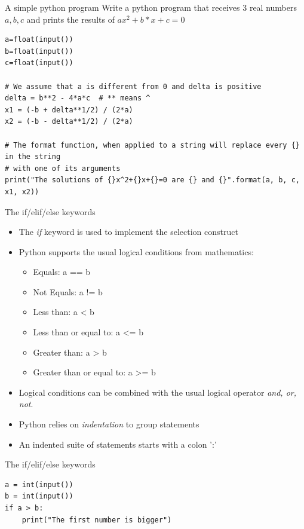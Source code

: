 \documentclass[aspectratio=169,]{beamer}
\begin{document}
\begin{frame}[fragile]{A simple python program}
    Write a python program that receives 3 real numbers $a, b, c$ and prints the results of $ax^2 + b*x + c = 0$
    \pause
    \begin{verbatim}
a=float(input())
b=float(input())
c=float(input())

# We assume that a is different from 0 and delta is positive
delta = b**2 - 4*a*c  # ** means ^
x1 = (-b + delta**1/2) / (2*a)
x2 = (-b - delta**1/2) / (2*a)

# The format function, when applied to a string will replace every {} in the string
# with one of its arguments
print("The solutions of {}x^2+{}x+{}=0 are {} and {}".format(a, b, c, x1, x2))
    \end{verbatim}
\end{frame}

\begin{frame}{The if/elif/else keywords}
    \begin{itemize}
        \item The \emph{if} keyword is used to implement the selection construct
        \item Python supports the usual logical conditions from mathematics:
            \begin{itemize}
                \item Equals: a == b
                \item Not Equals: a != b
                \item Less than: a < b
                \item Less than or equal to: a <= b
                \item Greater than: a > b
                \item Greater than or equal to: a >= b
            \end{itemize}
        \item Logical conditions can be combined with the usual logical operator \emph{and, or, not}.
        \item Python relies on \emph{indentation} to group statements
        \item An indented suite of statements starts with a colon ':'
    \end{itemize}
\end{frame}

\begin{frame}[fragile]{The if/elif/else keywords}
    \begin{verbatim}
a = int(input())
b = int(input())
if a > b:
    print("The first number is bigger")
    \end{verbatim}
\end{frame}
\end{document}

